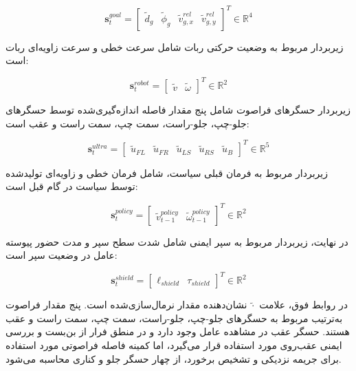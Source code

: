 \begin{equation}
	\mathbf{s}^{goal}_t =
	\begin{bmatrix}
		\tilde{d}_g &
		\tilde{\phi}_g &
		\tilde{v}^{rel}_{g,x} &
		\tilde{v}^{rel}_{g,y}
	\end{bmatrix}^{T}
	\in \mathbb{R}^{4}
	\label{eq:goal_fixed_features}
\end{equation}

زیر‌بردار مربوط به وضعیت حرکتی ربات شامل سرعت خطی و سرعت زاویه‌ای ربات است:

\begin{equation}
	\mathbf{s}^{robot}_t =
	\begin{bmatrix}
		\tilde{v} &
		\tilde{\omega}
	\end{bmatrix}^{T}
	\in \mathbb{R}^{2}
	\label{eq:robot_fixed_features}
\end{equation}

زیر‌بردار حسگرهای فراصوت شامل پنج مقدار فاصله اندازه‌گیری‌شده توسط حسگرهای جلو-چپ، جلو-راست، سمت چپ، سمت راست و عقب است:

\begin{equation}
	\mathbf{s}^{ultra}_t =
	\begin{bmatrix}
		\tilde{u}_{FL} &
		\tilde{u}_{FR} &
		\tilde{u}_{LS} &
		\tilde{u}_{RS} &
		\tilde{u}_{B}
	\end{bmatrix}^{T}
	\in \mathbb{R}^{5}
	\label{eq:ultrasonic_fixed_features}
\end{equation}

زیر‌بردار مربوط به فرمان قبلی سیاست، شامل فرمان خطی و زاویه‌ای تولیدشده توسط سیاست در گام قبل است:

\begin{equation}
	\mathbf{s}^{policy}_t =
	\begin{bmatrix}
		\tilde{v}^{policy}_{t-1} &
		\tilde{\omega}^{policy}_{t-1}
	\end{bmatrix}^{T}
	\in \mathbb{R}^{2}
	\label{eq:policy_fixed_features}
\end{equation}

در نهایت، زیر‌بردار مربوط به سپر ایمنی شامل شدت سطح سپر و مدت حضور پیوسته عامل در وضعیت سپر است:

\begin{equation}
	\mathbf{s}^{shield}_t =
	\begin{bmatrix}
		\ell_{shield} &
		\tau_{shield}
	\end{bmatrix}^{T}
	\in \mathbb{R}^{2}
	\label{eq:shield_fixed_features}
\end{equation}

در روابط فوق، علامت \(\tilde{\cdot}\) نشان‌دهنده مقدار نرمال‌سازی‌شده است. پنج مقدار فراصوت به‌ترتیب مربوط به حسگرهای جلو-چپ، جلو-راست، سمت چپ، سمت راست و عقب هستند. حسگر عقب در مشاهده عامل وجود دارد و در منطق فرار از بن‌بست و بررسی ایمنی عقب‌روی مورد استفاده قرار می‌گیرد، اما کمینه فاصله فراصوتی مورد استفاده برای جریمه نزدیکی و تشخیص برخورد، از چهار حسگر جلو و کناری محاسبه می‌شود.

